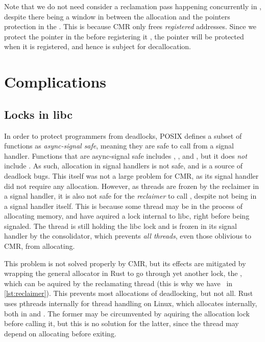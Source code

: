 Note that we do not need consider a reclamation pass happening concurrently in ,
despite there being a window in between the allocation and the pointers protection in the
. This is because CMR only frees \emph{registered} addresses. Since we protect the
pointer in the   before registering it , the pointer will be
protected when it is registered, and hence is subject for decallocation.



\section{Complications}
\blindtext%


\subsection{Locks in libc\label{sec:alloc-lock}}

In order to protect programmers from deadlocks, POSIX defines a subset of functions as
\emph{async-signal safe}, meaning they are safe to call from a signal handler. Functions that are
async-signal safe includes , , and , but it does \emph{not}
include . As such, allocation in signal handlers is not safe, and is a source of
deadlock bugs. This itself was not a large problem for CMR, as its signal handler did not require
any allocation. However, as threads are frozen by the reclaimer in a signal handler, it is also not
safe for the \emph{reclaimer} to call , despite not being in a signal handler itself.
This is because some thread may be in the process of allocating memory, and have aquired a lock
internal to libc, right before being signaled. The thread is still holding the libc lock and is
frozen in its signal handler by the consolidator, which prevents \emph{all threads}, even those
oblivious to CMR, from allocating.

This problem is not solved properly by CMR, but its effects are mitigated by wrapping the general
allocator in Rust to go through yet another lock, the , which can be aquired by
the reclamating thread (this is why we have~ in \cref{lst:reclaimer}). This
prevents most allocations of deadlocking, but not all. Rust uses \gls{pthreads} internally for thread
handling on Linux, which allocates internally, both in  and . The former may
be circumvented by aquiring the allocation lock before calling it, but this is no solution for the
latter, since the thread may depend on allocating before exiting.

